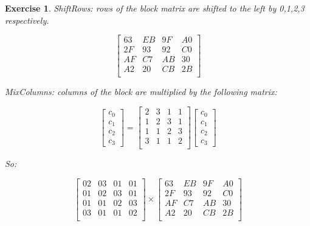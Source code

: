 \documentclass[a4paper, 12pt]{report}
\newtheorem{exercise}{\textbf{Exercise}}
\begin{document}
\begin{exercise}
	ShiftRows: rows of the block matrix are shifted to the left by 0,1,2,3 respectively.
	\begin{center}
		\[\left[ \begin{array}{cccc}
		63 & EB & 9F & A0 \\
		2F & 93 & 92 & C0 \\
		AF & C7 & AB & 30 \\
		A2 & 20 & CB & 2B \\
		\end{array} \right]\]
	\end{center}
	
	MixColumns: columns of the block are multiplied by the following matrix:
	
	\begin{center}	
		\[ \left[ \begin{array}{c}
		c_0 \\
		c_1 \\
		c_2 \\
		c_3
		\end{array} \right]
		=
		\left[ \begin{array}{cccc}
		2 & 3 & 1 & 1 \\
		1 & 2 & 3 & 1 \\
		1 & 1 & 2 & 3 \\
		3 & 1 & 1 & 2 \\
		\end{array} \right]
		\left[ \begin{array}{c}
		c_0 \\
		c_1 \\
		c_2 \\
		c_3
		\end{array} \right]
		\]
	\end{center}
	So:
	\begin{center}	
		\[ 
		\left[ \begin{array}{cccc}
		02 & 03 & 01 & 01 \\
		01 & 02 & 03 & 01 \\
		01 & 01 & 02 & 03 \\
		03 & 01 & 01 & 02 \\
		\end{array} \right]
		\times		
		\left[ \begin{array}{cccc}
		63 & EB & 9F & A0 \\
		2F & 93 & 92 & C0 \\
		AF & C7 & AB & 30 \\
		A2 & 20 & CB & 2B \\
		\end{array} \right]		
\]
\end{center}
\end{exercise}
\end{document}
